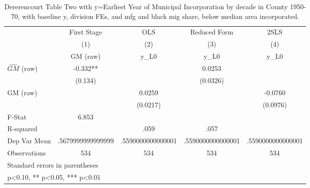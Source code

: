 \begin{table}[htbp]\centering
\def\sym#1{\ifmmode^{#1}\else\(^{#1}\)\fi}
\caption{Dererencourt Table Two with y=Earliest Year of Municipal Incorporation by decade in County 1950-70, with baseline y, division FEs, and mfg and black mig share, below median area incorporated.}
\begin{tabular}{l*{4}{c}}
\toprule
                    & First Stage   &         OLS   &Reduced Form   &        2SLS   \\
                    &\multicolumn{1}{c}{(1)}&\multicolumn{1}{c}{(2)}&\multicolumn{1}{c}{(3)}&\multicolumn{1}{c}{(4)}\\
                    &\multicolumn{1}{c}{GM  (raw)}&\multicolumn{1}{c}{y\_L0}&\multicolumn{1}{c}{y\_L0}&\multicolumn{1}{c}{y\_L0}\\
\midrule
$\hat{GM}$ (raw)    &      -0.332** &               &      0.0253   &               \\
                    &     (0.134)   &               &    (0.0326)   &               \\
\addlinespace
GM  (raw)           &               &      0.0259   &               &     -0.0760   \\
                    &               &    (0.0217)   &               &    (0.0976)   \\
\midrule
F-Stat              &       6.853   &               &               &               \\
R-squared           &               &        .059   &        .057   &               \\
Dep Var Mean        &.5679999999999999   &.5590000000000001   &.5590000000000001   &.5590000000000001   \\
Observations        &         534   &         534   &         534   &         534   \\
\bottomrule
\multicolumn{5}{l}{\footnotesize Standard errors in parentheses}\\
\multicolumn{5}{l}{\footnotesize * p<0.10, ** p<0.05, *** p<0.01}\\
\end{tabular}
\end{table}
